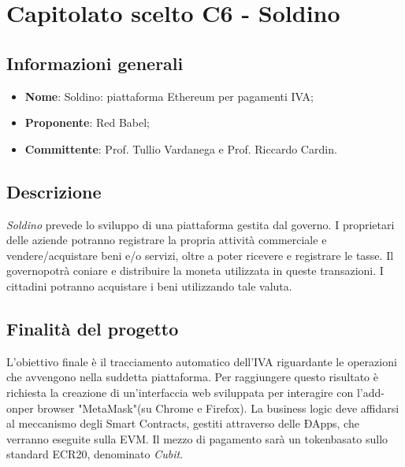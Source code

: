 \section{Capitolato scelto C6 - Soldino}
\subsection{Informazioni generali}
% 
\begin{itemize}
\item \textbf{Nome}: Soldino: piattaforma Ethereum per pagamenti IVA;
\item \textbf{Proponente}: Red Babel;
\item \textbf{Committente}: Prof. Tullio Vardanega e Prof. Riccardo Cardin.
\end{itemize}

\subsection{Descrizione}
\textit{Soldino} prevede lo sviluppo di una piattaforma gestita dal governo\glo. I proprietari delle aziende potranno registrare la propria attività commerciale e vendere/acquistare beni e/o servizi, oltre a poter ricevere e registrare le tasse. Il governo\glosp potrà coniare e distribuire la moneta utilizzata in queste transazioni. I cittadini potranno acquistare i beni utilizzando tale valuta.

\subsection{Finalità del progetto}
L'obiettivo finale è il tracciamento automatico dell'IVA riguardante le operazioni che avvengono nella suddetta piattaforma. Per raggiungere questo risultato è richiesta la creazione di un'interfaccia web sviluppata per interagire con l'add-on\glosp per browser "MetaMask"\glosp (su Chrome e Firefox). La business logic deve affidarsi al meccanismo degli Smart Contracts\glo, gestiti attraverso delle ÐApps\glo, che verranno eseguite sulla EVM\glo. Il mezzo di pagamento sarà un token\glosp basato sullo standard ECR20\glo, denominato \textit{Cubit}\glo. 



